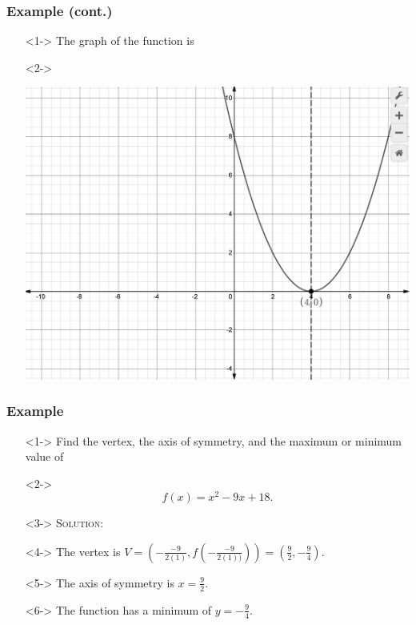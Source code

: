 \documentclass[handout]{beamer}
\begin{document}
\begin{frame}
	\frametitle{Example (cont.)}
	\begin{enumerate}
		\item[]<1-> The graph of the function is
		\item[]<2->\begin{center}
				\includegraphics[scale=0.25]{3_3_4.png}
			\end{center}
	\end{enumerate}
\end{frame}

\begin{frame}
	\frametitle{Example}
	\begin{enumerate}
		\item[]<1-> Find the vertex, the axis of symmetry, and the maximum or minimum value of
		\item[]<2->\[ f(x)=x^{2}-9x+18. \]
		\item[]<3-> \textsc{Solution:}
		\item[]<4-> The vertex is $V=\left( -\frac{-9}{2(1)}, f \left( -\frac{-9}{2(1))} \right)\right)=\left( \frac{9}{2}, -\frac{9}{4}\right)$.
		\item[]<5-> The axis of symmetry is $x=\frac{9}{2}$.
		\item[]<6-> The function has a minimum of $y=-\frac{9}{4}$.
	\end{enumerate}
\end{frame}
\end{document}
